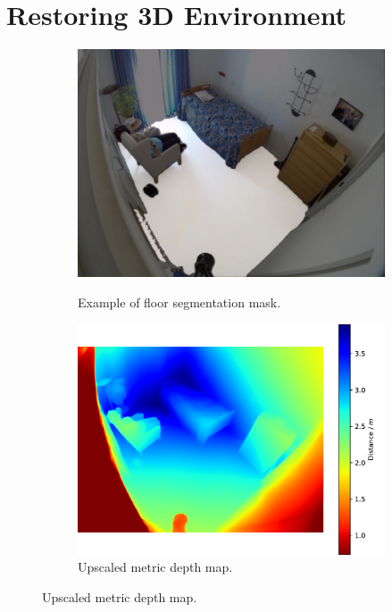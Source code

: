 \section{Restoring 3D Environment}
\begin{figure}
    \centering
    \begin{subfigure}[b]{0.4\textwidth}
        \includegraphics[width=\linewidth]{figures/floor.png}
        \label{fig:floor-mask}
        \caption{Example of floor segmentation mask.}
    \end{subfigure}
    \hfill
    \begin{subfigure}[b]{0.5\textwidth}
        \includegraphics[width=\linewidth]{figures/depth.pdf}
        \caption{Upscaled metric depth map.}
    \end{subfigure}
\end{figure}

